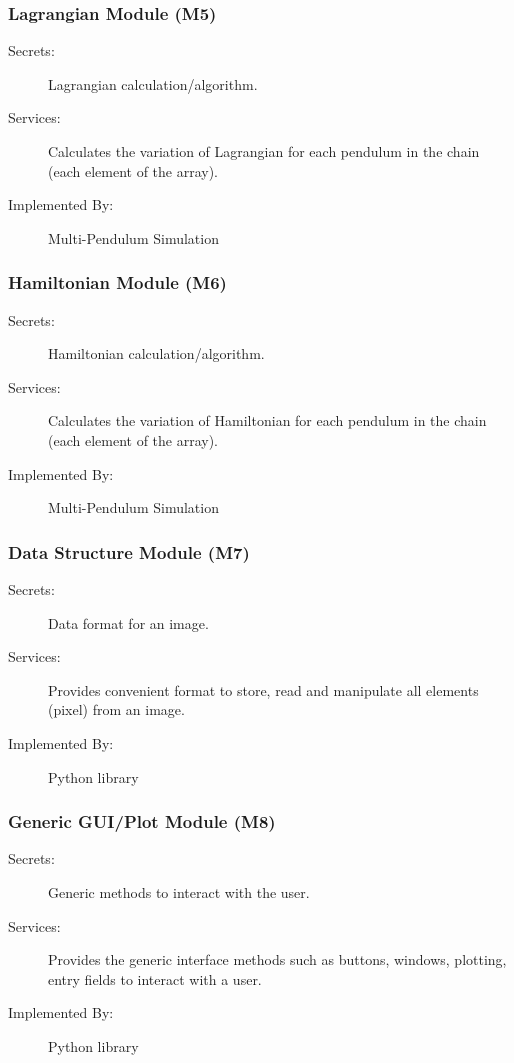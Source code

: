\documentclass[12pt, titlepage]{article}
\newcommand{\progname}{Multi-Pendulum Simulation }
\begin{document}
\subsubsection{Lagrangian Module (M5)}
\label{MG_LA}
\begin{description}
\item[Secrets:] Lagrangian calculation/algorithm.
\item[Services:] Calculates the variation of Lagrangian for each pendulum in the chain 
(each element of the array).
\item[Implemented By:] \progname{}
\end{description}

\subsubsection{Hamiltonian Module (M6)}
\label{MG_HA}
\begin{description}
\item[Secrets:] Hamiltonian calculation/algorithm.
\item[Services:] Calculates the variation of Hamiltonian for each pendulum in the chain 
(each element of the array).
\item[Implemented By:] \progname{}
\end{description}

\subsubsection{Data Structure Module (M7)}
\label{MG_DataStruct}
\begin{description}
\item[Secrets:] Data format for an image.
\item[Services:] Provides convenient format to store, read and manipulate all 
elements (pixel) from an image.
\item[Implemented By:] Python library
\end{description}

\subsubsection{Generic GUI/Plot Module (M8)}
\label{MG_GUIGene}
\begin{description}
\item[Secrets:] Generic methods to interact with the user.
\item[Services:] Provides the generic interface methods such as buttons, 
windows, plotting, entry fields to interact with a user.
\item[Implemented By:] Python library
\end{description}
\end{document}
